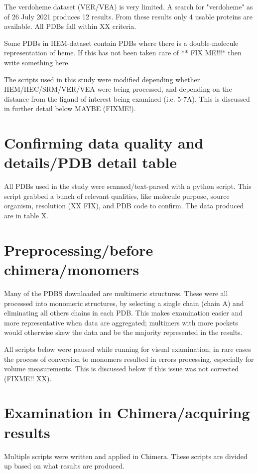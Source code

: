 	The verdoheme dataset (VER/VEA) is very limited. A search for "verdoheme" as of 26 July 2021 produces 12 results. From these results only 4 usable proteins are available. All PDBs fall within XX criteria. 
	
	
	Some PDBs in HEM-dataset contain PDBs where there is a double-molecule representation of heme. If this has not been taken care of ** FIX ME!!!* then write something here.
	
	The scripts used in this study were modified depending whether HEM/HEC/SRM/VER/VEA were being processed, and depending on the distance from the ligand of interest being examined (i.e. 5-7A). This is discussed in further detail below MAYBE (FIXME!).
	
	\section*{Confirming data quality and details/PDB detail table}
	All PDBs used in the study were scanned/text-parsed with a python script. This script grabbed a bunch of relevant qualities, like molecule purpose, source organism, resolution (XX FIX), and PDB code to confirm. The data produced are in table X. 
	
	\section*{Preprocessing/before chimera/monomers}
	Many of the PDBS downloaded are multimeric structures. These were all processed into monomeric structures, by selecting a single chain (chain A) and eliminating all others chains in each PDB. This makes examination easier and more representative when data are aggregated; multimers with more pockets would otherwise skew the data and be the majority represented in the results. 
	
	All scripts below were paused while running for visual examination; in rare cases the process of conversion to monomers resulted in errors processing, especially for volume measurements. This is discussed below if this issue was not corrected (FIXME!! XX).
	
	\section*{Examination in Chimera/acquiring results}
	Multiple scripts were written and applied in Chimera. These scripts are divided up based on what results are produced. 
	
